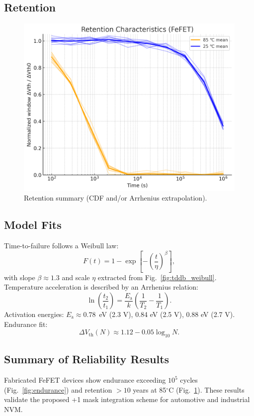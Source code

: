 \documentclass[conference]{IEEEtran}
\newcommand{\Vth}{V_{\mathrm{th}}}
\newcommand{\Ea}{E_{\mathrm{a}}}
\newcommand{\betaW}{\beta}
\newcommand{\etaW}{\eta}
\newcommand{\figw}{0.90\linewidth}
\begin{document}
\subsection{Retention}
\begin{figure}[!htb]
  \centering
  \includegraphics[width=\figw]{figures/fig6_retention.png}
  \caption{Retention summary (CDF and/or Arrhenius extrapolation).}
  \label{fig:retention}
\end{figure}

\subsection{Model Fits}
Time-to-failure follows a Weibull law:
\begin{equation}
  F(t)=1-\exp\!\left[-\left(\frac{t}{\etaW}\right)^{\betaW}\right],
\end{equation}
with slope $\betaW \approx 1.3$ and scale $\etaW$ extracted from Fig.~\ref{fig:tddb_weibull}.
Temperature acceleration is described by an Arrhenius relation:
\begin{equation}
  \ln\!\left(\frac{t_2}{t_1}\right)=\frac{\Ea}{k}\!\left(\frac{1}{T_2}-\frac{1}{T_1}\right).
\end{equation}
Activation energies: $\Ea \approx 0.78$~eV (2.3 V), 0.84 eV (2.5 V), 0.88 eV (2.7 V).  
Endurance fit:
\begin{equation}
  \Delta \Vth(N) \approx 1.12 - 0.05\log_{10} N.
\end{equation}

\subsection*{Summary of Reliability Results}
Fabricated FeFET devices show endurance exceeding $10^5$ cycles (Fig.~\ref{fig:endurance}) and retention $>10$ years at 85$^\circ$C (Fig.~\ref{fig:retention}).  
These results validate the proposed +1 mask integration scheme for automotive and industrial NVM.
\end{document}

